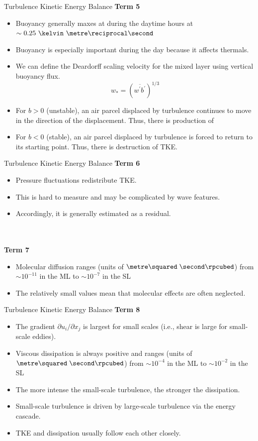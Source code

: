 \begin{frame}{Turbulence Kinetic Energy Balance}
\textbf{Term 5}
\begin{itemize}
	\item Buoyancy generally maxes at during the daytime hours at $\sim 0.25\ \kelvin\ \metre\reciprocal\second$
	\item Buoyancy is especially important during the day because it affects thermals.
	\item We can define the Deardorff scaling velocity for the mixed layer using vertical buoyancy flux.
	$$w_* = (\overline{w^\prime b^\prime})^{1/3}$$
	\item For $b>0$ (unstable), an air parcel displaced by turbulence continues to move in the direction of the displacement. Thus, there is production of 
	\item For $b<0$ (stable), an air parcel displaced by turbulence is forced to return to its starting point. Thus, there is destruction of TKE.
	\end{itemize}
\end{frame}
\begin{frame}{Turbulence Kinetic Energy Balance}
\textbf{Term 6}
\begin{itemize}
	\item Pressure fluctuations redistribute TKE.
	\item This is hard to measure and may be complicated by wave features.
	\item Accordingly, it is generally estimated as a residual. 
\end{itemize}
~\\~\\
\textbf{Term 7}
\begin{itemize}
	\item Molecular diffusion ranges (units of $\metre\squared\; \second\rpcubed$) from $\sim 10^{-11}$ in the ML to $\sim 10^{-7}$ in the SL
	\item The relatively small values mean that molecular effects are often neglected.
\end{itemize}
\end{frame}
\begin{frame}{Turbulence Kinetic Energy Balance}
\textbf{Term 8}
\begin{itemize}
	\item The gradient $\partial u_i/\partial x_j$ is largest for small scales (i.e., shear is large for small-scale eddies).
	\item Viscous dissipation is always positive and ranges (units of $\metre\squared\; \second\rpcubed$) from $\sim 10^{-4}$ in the ML to $\sim 10^{-2}$ in the SL
	\item The more intense the small-scale turbulence, the stronger the dissipation.
	\item Small-scale turbulence is driven by large-scale turbulence via the energy cascade.
	\item TKE and dissipation usually follow each other closely.
	\end{itemize}
\end{frame}
